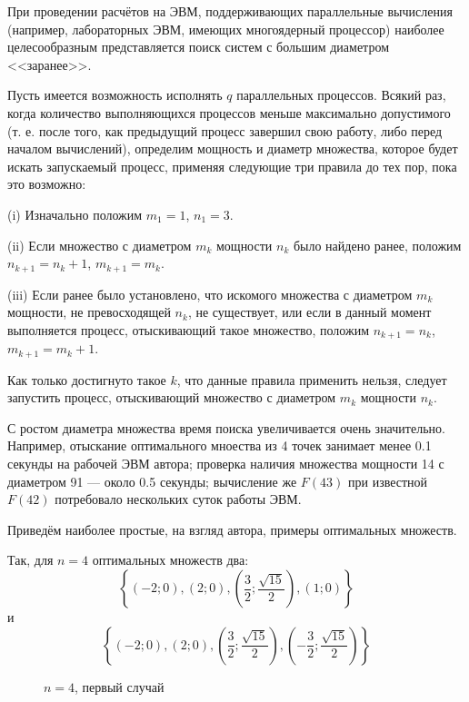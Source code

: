 \documentclass{article}
\begin{document}
При проведении расчётов на ЭВМ, поддерживающих параллельные вычисления (например, лабораторных ЭВМ, имеющих многоядерный процессор) наиболее целесообразным представляется поиск систем с большим диаметром <<заранее>>.

Пусть имеется возможность исполнять $q$ параллельных процессов.
Всякий раз, когда количество выполняющихся процессов меньше максимально допустимого (т. е. после того, как предыдущий процесс завершил свою работу, либо перед началом вычислений), определим мощность и диаметр множества, которое будет искать запускаемый процесс, применяя следующие три правила до тех пор, пока это возможно:

(i)
Изначально положим $m_1=1$, $n_1=3$.

(ii)
Если множество с диаметром $m_k$ мощности $n_k$ было найдено ранее, положим $n_{k+1} = n_k +1$, $m_{k+1} = m_k$.

(iii)
Если ранее было установлено, что искомого множества с диаметром $m_k$ мощности, не превосходящей $n_k$, не существует,
или если в данный момент выполняется процесс, отыскивающий такое множество, положим $n_{k+1} = n_k$, $m_{k+1} = m_k+1$.

Как только достигнуто такое $k$, что данные правила применить нельзя, следует запустить процесс, отыскивающий множество с диаметром $m_k$ мощности $n_k$.


С ростом диаметра множества время поиска увеличивается очень значительно.
Например, отыскание оптимального мноества из 4 точек занимает менее 0.1 секунды на рабочей ЭВМ автора;
проверка наличия множества мощности 14 с диаметром 91 --- около 0.5 секунды;
вычисление же $F(43)$ при известной $F(42)$ потребовало нескольких суток работы ЭВМ.



Приведём наиболее простые, на взгляд автора, примеры оптимальных множеств.

Так, для $n=4$ оптимальных множеств два:
$$
\left\{\left( -2 ; 0\right),\left( 2 ; 0\right),\left( \frac{3}{2} ; \frac{\sqrt{15}}{2}\right),\left( 1 ; 0\right)\right\}
$$
и
$$
\left\{\left( -2 ; 0\right),\left( 2 ; 0\right),\left( \frac{3}{2} ; \frac{\sqrt{15}}{2}\right),\left( -\frac{3}{2} ; \frac{\sqrt{15}}{2}\right)\right\}
$$


\begin{figure}[h]
\caption{$n=4$, первый случай}
\label{ris:image}
\end{figure}
\end{document}
